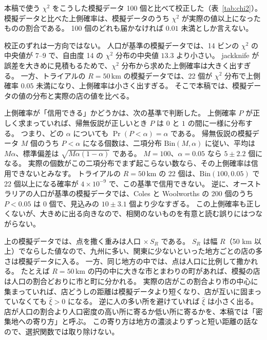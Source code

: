 \documentclass[a4paper,11pt]{ltjsarticle}
\begin{document}
本稿で使う $\chi^2$ をこうした模擬データ 100 個と比べて校正した（表~\ref{tab:chi2}）。
模擬データと比べた上側確率は、模擬データのうち $\chi^2$ が実際の値以上になったものの割合である。
100 個のどれも届かなければ $0.01$ 未満としか言えない。
\begin{table}[t]
  \centering
  \caption{$\chi^2$ の上側確率を、帰無仮説の模擬データ 100 個と比べて校正した値。
    $\chi^2$ は Hartlap の因子をかけた値で、「$\chi^2$ 分布」はそれを自由度がビンの数の $\chi^2$ 分布（式~\eqref{eq:chi2-pdf}）と比べた上側確率。
    模擬データは、人口が基準の行では店と同じ数の点を人口だけに比例して撒き、$R$ の行では幅 $R$ の選択関数に従って撒いた。
    日本の $R = 50$、$100\,\mathrm{km}$ の模擬データでは選択関数を点ごとに求め、ほかは 10 km 格子の表で求めた（\ref{app:grid}）。
    $3$--$25\,\mathrm{km}$ の 4 ビンには $8\,\mathrm{km}$ より短い 2 ビンも入る。ビンごとの比較は表~\ref{tab:short}。}
  \label{tab:chi2}
  \small
  \setlength{\tabcolsep}{5pt}
  
\end{table}
校正のずれは一方向ではない。
人口が基準の模擬データでは、14 ビンの $\chi^2$ の中央値が $7$--$9$ で、自由度 14 の $\chi^2$ 分布の中央値 $13.3$ より小さい。
jackknife が誤差を大きめに見積もるためで、$\chi^2$ 分布から求めた上側確率は大きく出すぎる。
一方、トライアルの $R = 50\,\mathrm{km}$ の模擬データでは、22 個が $\chi^2$ 分布で上側確率 $0.05$ 未満になり、上側確率は小さく出すぎる。
そこで本稿では、模擬データの値の分布と実際の店の値を比べる。

上側確率が「信用できる」かどうかは、次の基準で判断した。
上側確率 $P$ が正しく求まっていれば、帰無仮説が正しいとき $P$ は $0$ と $1$ の間に一様に分布する。
つまり、どの $\alpha$ についても $\Pr(P < \alpha) = \alpha$ である。
帰無仮説の模擬データ $M$ 個のうち $P < \alpha$ になる個数は、二項分布 $\mathrm{Bin}(M, \alpha)$ に従い、平均は $M\alpha$、標準偏差は $\sqrt{M\alpha(1-\alpha)}$ である。
$M = 100$、$\alpha = 0.05$ なら $5 \pm 2.2$ 個になる。
実際の個数がこの二項分布でまず起こらない数なら、その上側確率は信用できないとみなす。
トライアルの $R = 50\,\mathrm{km}$ の 22 個は、$\mathrm{Bin}(100, 0.05)$ で 22 個以上になる確率が $4 \times 10^{-9}$ で、この基準で信用できない。
逆に、オーストラリアの人口が基準の模擬データでは、Coles と Woolworths の 200 個のうち $P < 0.05$ は 0 個で、見込みの $10 \pm 3.1$ 個より少なすぎる。
この上側確率も正しくないが、大きめに出る向きなので、相関のないものを有意と読む誤りにはつながらない。

上の模擬データでは、点を撒く重みは人口 $\times\, S_R$ である。
$S_R$ は幅 $R$（50 km 以上）でならした値なので、九州に多い、関東に少ないといった地方ごとの店の多さは模擬データに入る。
一方、同じ地方の中では、点は人口に比例して撒かれる。
たとえば $R = 50\,\mathrm{km}$ の円の中に大きな市とまわりの町があれば、模擬の店は人口の割合どおりに市と町に分かれる。
実際の店がこの割合より市の中心に集まっていれば、店どうしの距離は模擬データより短くなり、店が互いに固まっていなくても $\hat\xi > 0$ になる。
逆に人の多い所を避けていれば $\hat\xi$ は小さく出る。
店が人口の割合より人口密度の高い所に寄るか低い所に寄るかを、本稿では「密集地への寄り方」と呼ぶ。
この寄り方は地方の濃淡よりずっと短い距離の話なので、選択関数では取り除けない。
\end{document}
